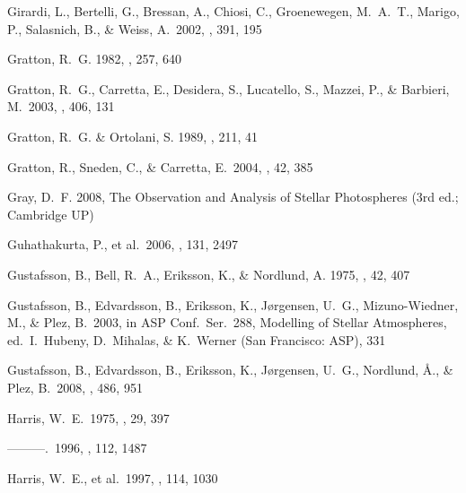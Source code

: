 \documentclass{emulateapj}
\begin{document}
\begin{thebibliography}{}

 Girardi, L., Bertelli, G.,
  Bressan, A., Chiosi, C., Groenewegen, M.~A.~T., Marigo, P.,
  Salasnich, B., \& Weiss, A.\ 2002, \aap, 391, 195

 Gratton, R.~G. 1982, \apj, 257, 640

 Gratton, R.~G., Carretta, E.,
  Desidera, S., Lucatello, S., Mazzei, P., \& Barbieri, M.\ 2003,
  \aap, 406, 131

 Gratton, R.~G. \& Ortolani,
  S. 1989, \aap, 211, 41

 Gratton, R., Sneden, C., \&
  Carretta, E.\ 2004, \araa, 42, 385

 Gray, D.~F. 2008, The Observation and
  Analysis of Stellar Photospheres (3rd ed.; Cambridge UP)



 Guhathakurta, P., et
  al.\ 2006, \aj, 131, 2497

 Gustafsson, B., Bell, R.~A.,
  Eriksson, K., \& Nordlund, A. 1975, \aap, 42, 407

 Gustafsson, B., Edvardsson,
  B., Eriksson, K., J{\o}rgensen, U.~G., Mizuno-Wiedner, M., \& Plez,
  B.\ 2003, in ASP Conf.\ Ser.\ 288, Modelling of Stellar Atmospheres,
  ed.\ I.~Hubeny, D.~Mihalas, \& K.~Werner (San Francisco: ASP), 331

 Gustafsson, B., Edvardsson,
  B., Eriksson, K., J{\o}rgensen, U.~G., Nordlund, {\AA}., \& Plez,
  B.\ 2008, \aap, 486, 951

 Harris, W.~E.\ 1975, \apjs, 29, 397

 ---------.\ 1996, \aj, 112, 1487

 Harris, W.~E., et al.\ 1997, \aj,
  114, 1030


\end{thebibliography}
\end{document}
